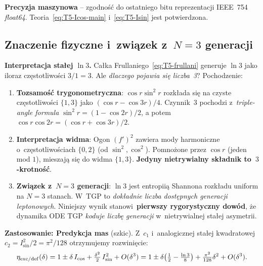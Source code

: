 \textbf{Precyzja maszynowa} -- zgodno\'s\'c do ostatniego bitu reprezentacji
IEEE~754 \emph{float64}. Teoria~\eqref{eq:T5-Icos-main}
i~\eqref{eq:T5-Isin} jest potwierdzona.

\subsection{Znaczenie fizyczne i~zwi\k{a}zek z~$N=3$ generacji}
\label{app:T5-physical}

\textbf{Interpretacja stałej $\ln 3$.}
Ca\l{}ka Frullaniego~\eqref{eq:T5-frullani} generuje $\ln 3$ jako
iloraz cz\k{e}stotliwo\'sci $3/1 = 3$. Ale \emph{dlaczego
pojawia si\k{e} liczba~3}? Pochodzenie:
\begin{enumerate}
  \item \textbf{Tozsamo\'s\'c trygonometryczna}: $\cos r \sin^2 r$
        rozkłada się na czyste cz\k{e}stotliwo\'sci $\{1, 3\}$ jako
        $(\cos r - \cos 3r)/4$. Czynnik~3 pochodzi z~\emph{triple-angle
        formula} $\sin^2 r = (1 - \cos 2r)/2$, a potem $\cos r \cos 2r
        = (\cos r + \cos 3r)/2$.
  \item \textbf{Interpretacja widma}: Ogon $(f')^2$ zawiera mody
        harmoniczne o~cz\k{e}stotliwo\'sciach $\{0, 2\}$ (od $\sin^2, \cos^2$).
        Pomno\.zone przez $\cos r$ (jeden mod $1$), mieszaj\k{a} si\k{e}
        do widma $\{1, 3\}$. \textbf{Jedyny nietrywialny sk\l{}adnik
        to~$3$-krotno\'s\'c}.
  \item \textbf{Zwi\k{a}zek z~$N=3$ generacji}: $\ln 3$ jest entropii\k{a}
        Shannona rozk\l{}adu uniform na $N = 3$ stanach. W~TGP to
        \emph{dok\l{}adnie liczba dost\k{e}pnych generacji leptonowych}.
        Niniejszy wynik stanowi~\textbf{pierwszy rygorystyczny dow\'od},
        \.ze dynamika ODE TGP \emph{koduje liczb\k{e} generacji}
        w~nietrywialnej sta\l{}ej asymetrii.
\end{enumerate}

\textbf{Zastosowanie: Predykcja mas} (szkic).
Z~$c_1$ i~analogicznej sta\l{}ej kwadratowej $c_2 = I_{\sin}^2/2 = \pi^2/128$
otrzymujemy rozwinięcie:
\begin{equation}\label{eq:T5-eta-exp}
  \eta_{\rm exc/def}(\delta) = 1 \pm \delta\,I_{\cos} + \tfrac{\delta^2}{2}\,I_{\sin}^2 + O(\delta^3)
                             = 1 \pm \delta\!\left(\tfrac{1}{2} - \tfrac{\ln 3}{8}\right) + \tfrac{\pi^2}{128}\delta^2 + O(\delta^3).
\end{equation}

